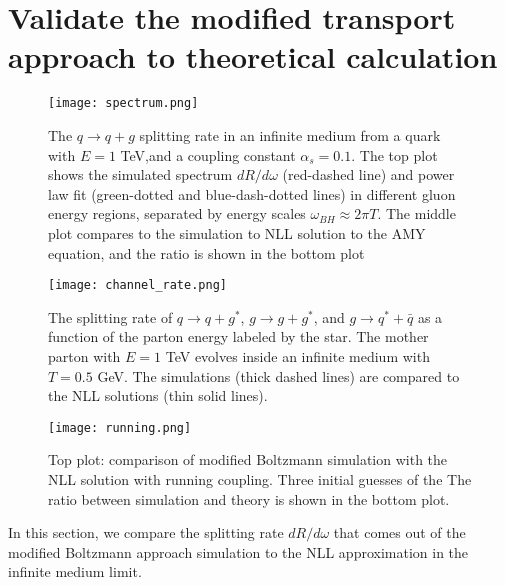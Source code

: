 \section{Validate the modified transport approach to theoretical calculation}


\begin{figure}
\texttt{[image: spectrum.png]}
\caption{The $q\rightarrow q+g$ splitting rate in an infinite medium from a quark with $E=1$ TeV,and a coupling constant $\alpha_s = 0.1$. The top plot shows the simulated spectrum $dR/d\omega$ (red-dashed line) and power law fit (green-dotted and blue-dash-dotted lines) in different gluon energy regions, separated by energy scales $\omega_{BH}\approx 2\pi T$. The middle plot compares to the simulation to NLL solution to the AMY equation, and the ratio is shown in the bottom plot}
\label{fig:spectrum}
\end{figure}

\begin{figure}
\texttt{[image: channel\_rate.png]}
\caption{The splitting rate of $q\rightarrow q+g^*$, $g\rightarrow g+g^*$, and $g\rightarrow q^* + \bar{q}$ as a function of the parton energy labeled by the star. The mother parton with $E=1$ TeV evolves inside an infinite medium with $T=0.5$ GeV. The simulations (thick dashed lines) are compared to the NLL solutions (thin solid lines).}
\label{fig:channel_rate}
\end{figure}

\begin{figure}
\texttt{[image: running.png]}
\caption{Top plot: comparison of modified Boltzmann simulation with the NLL solution  with running coupling.
Three initial guesses of the 
The ratio between simulation and theory is shown in the bottom plot.}
\label{fig:running}
\end{figure}

In this section, we compare the splitting rate $dR/d\omega$ that comes out of the modified Boltzmann approach simulation to the NLL approximation in the infinite medium limit.

